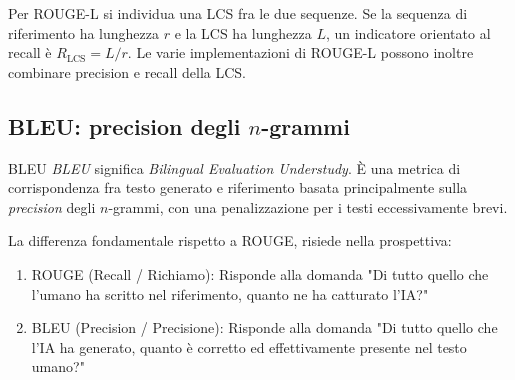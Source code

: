 Per ROUGE-L si individua una LCS fra le due sequenze. Se la sequenza di riferimento ha lunghezza $r$ e la LCS ha lunghezza $L$, un indicatore orientato al recall è $R_{\mathrm{LCS}}=L/r$. Le varie implementazioni di ROUGE-L possono inoltre combinare precision e recall della LCS.

\subsection{BLEU: precision degli $n$-grammi}

\begin{definition}{BLEU}
\emph{BLEU} significa \emph{Bilingual Evaluation Understudy}. È una metrica di corrispondenza fra testo generato e riferimento basata principalmente sulla \emph{precision} degli $n$-grammi, con una penalizzazione per i testi eccessivamente brevi.
\end{definition}
La differenza fondamentale rispetto a ROUGE, risiede nella prospettiva:
\begin{enumerate}
    \item ROUGE (Recall / Richiamo): Risponde alla domanda "Di tutto quello che l'umano ha scritto nel riferimento, quanto ne ha catturato l'IA?"
    \item BLEU (Precision / Precisione): Risponde alla domanda "Di tutto quello che l'IA ha generato, quanto è corretto ed effettivamente presente nel testo umano?"
\end{enumerate}



